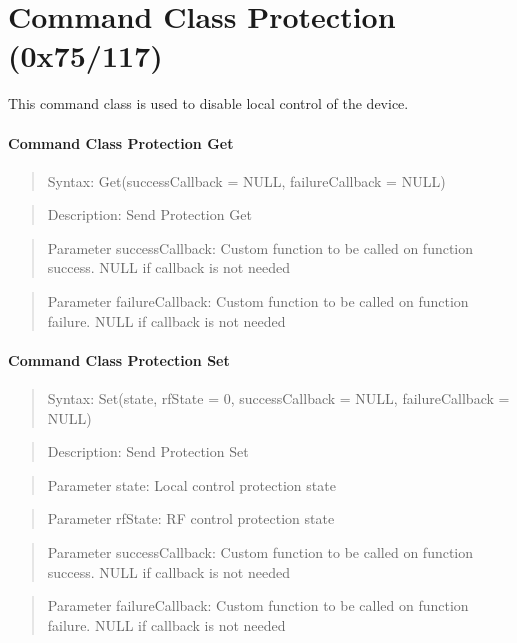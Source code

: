 \section{Command Class Protection (0x75/117)}

This command class is used to disable local control of the device.

\paragraph {Command Class Protection Get}
\begin{quote} Syntax: Get(successCallback = NULL, failureCallback = NULL)\end{quote}
\begin{quote} Description: Send Protection Get\end{quote}
\begin{quote} Parameter successCallback: Custom function to be called on function success. NULL if callback is not needed\end{quote}
\begin{quote} Parameter failureCallback: Custom function to be called on function failure. NULL if callback is not needed\end{quote}

\paragraph {Command Class Protection Set}
\begin{quote} Syntax: Set(state, rfState = 0, successCallback = NULL, failureCallback = NULL)\end{quote}
\begin{quote} Description: Send Protection Set\end{quote}
\begin{quote} Parameter state: Local control protection state\end{quote}
\begin{quote} Parameter rfState: RF control protection state\end{quote}
\begin{quote} Parameter successCallback: Custom function to be called on function success. NULL if callback is not needed\end{quote}
\begin{quote} Parameter failureCallback: Custom function to be called on function failure. NULL if callback is not needed\end{quote}


